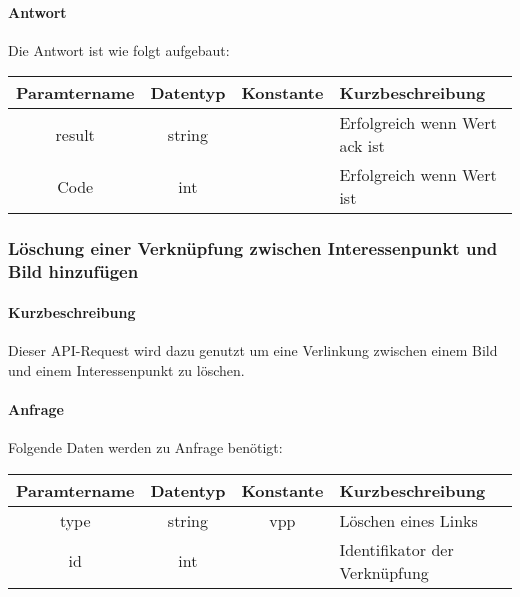\paragraph{Antwort}Die Antwort ist wie folgt aufgebaut:
\begin{table}[H]
	\begin{tabular}{|c|c|c|p{6.5cm}|}
		\hline
		\textbf{Paramtername} & \textbf{Datentyp} & \textbf{Konstante} & \textbf{Kurzbeschreibung}                                                                                               \\ \hline
		result              & string           &                 & Erfolgreich wenn Wert {\glqq ack\grqq} ist \\ \hline
		Code                & int              &                 & Erfolgreich wenn Wert {\glqq 0\grqq} ist \\ \hline
	\end{tabular}
\end{table}
\subsubsection{Löschung einer Verknüpfung zwischen Interessenpunkt und Bild hinzufügen}
\paragraph{Kurzbeschreibung}Dieser API-Request wird dazu genutzt um eine Verlinkung zwischen einem Bild und einem Interessenpunkt zu löschen.
\paragraph{Anfrage}Folgende Daten werden zu Anfrage benötigt:
\begin{table}[H]
	\begin{tabular}{|c|c|c|p{6.5cm}|}
		\hline
		\textbf{Paramtername} & \textbf{Datentyp} & \textbf{Konstante} & \textbf{Kurzbeschreibung}                                                                                               \\ \hline
		type                & string            & vpp                & Löschen eines Links \\ \hline
		id                  & int               &                    & Identifikator der Verknüpfung \\ \hline
	\end{tabular}
\end{table}
